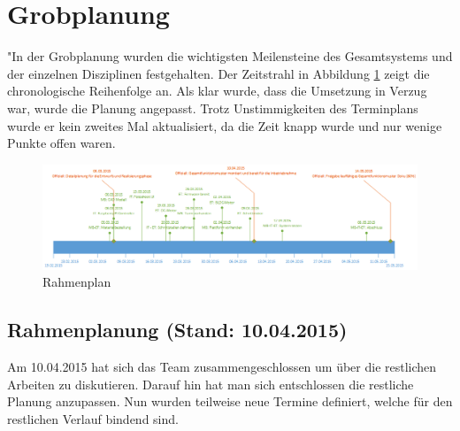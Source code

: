 \section{Grobplanung}"In der Grobplanung wurden die wichtigsten Meilensteine des Gesamtsystems und der einzelnen Disziplinen festgehalten.
Der Zeitstrahl in Abbildung \ref{fig:rahmenplanung} zeigt die chronologische Reihenfolge an. Als klar wurde, dass die Umsetzung in Verzug war, wurde die Planung angepasst.
Trotz Unstimmigkeiten des Terminplans wurde er kein zweites Mal aktualisiert, da die Zeit knapp wurde und nur wenige Punkte offen waren.

\begin{landscape}
	\begin{figure}
		\centering
		\includegraphics[width=1\linewidth]{../../fig/rahmenplanung}
		\caption{Rahmenplan}
		\label{fig:rahmenplanung}
	\end{figure}
\end{landscape}

\subsection{Rahmenplanung (Stand: 10.04.2015)}

Am 10.04.2015 hat sich das Team zusammengeschlossen um über die restlichen Arbeiten zu diskutieren. Darauf hin hat man sich entschlossen die restliche Planung anzupassen. Nun wurden teilweise neue Termine definiert, welche für den restlichen Verlauf bindend sind.

